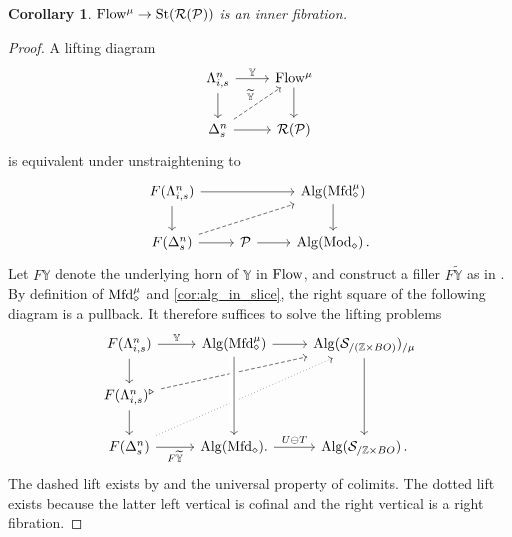 \documentclass[10pt]{amsart}
\numberwithin{equation}{section}
\newtheorem{cor}[prop]{Corollary}
\theoremstyle{definition}
\DeclareMathOperator{\Mod}{Mod}
\DeclareMathOperator{\St}{St}
\newcommand{\PreFlow}{\mathrm{Flow}\vphantom{w}}
\newcommand{\Mfd}{\mathrm{Mfd}\vphantom{d}}
\newcommand{\Alg}{\mathrm{Alg}\vphantom{z}}
\newcommand{\bZ}{\mathbb{Z}}
\newcommand{\bY}{\mathbb{Y}}
\newcommand{\Horn}{\Lambda}
\newcommand{\cP}{\mathcal{P}}
\newcommand{\cS}{\mathcal{S}}
\newcommand{\cR}{\mathcal{R}}
\renewcommand{\to}{\mathchoice{\longrightarrow}{\rightarrow}{}{}}
\begin{document}
\begin{cor}\label{cor:horn_filling}
	$\PreFlow^{\mu}\to \St(\cR(\cP))$ is an inner fibration.
\end{cor}
\begin{proof}
	A lifting diagram
	\begin{equation*}
		\begin{tikzcd}
			\Horn_{i,s}^{n} \arrow[r, "\bY"] \arrow[d]      &   \PreFlow^{\mu}  \arrow[d] \\
			\Delta^{n}_{s}  \arrow[r]  \arrow[ur,dashed, "\widetilde{\bY}"]           &  \cR(\cP)
		\end{tikzcd}
	\end{equation*}
	is equivalent under unstraightening to
	\begin{equation*}
		\begin{tikzcd}
			F(\Horn^{n}_{i,s}) \arrow[rr] \arrow[d]      &&   \Alg(\Mfd_{\diamond}^{\mu})  \arrow[d] \\
			F(\Delta^{n}_{s}) \arrow[r] \arrow[urr, dashed] &\cP  \arrow[r]               &   \Alg(\Mod_{\diamond}) \,.
		\end{tikzcd}
	\end{equation*}
	Let $F\bY$ denote the underlying horn of $\bY$ in $\PreFlow$, and construct a filler $F\widetilde{\bY}$ as in .
  By definition of $\Mfd_{\diamond}^{\mu}$ and \eqref{cor:alg_in_slice}, the right square of the following diagram is a pullback.
  It therefore suffices to solve the lifting problems
	\begin{equation*}
		\begin{tikzcd}
			F(\Horn_{i,s}^{n}) \arrow[r, "\bY"] \arrow[d]      & \Alg(\Mfd_{\diamond}^{\mu}) \arrow[r] &   \Alg(\cS_{/ (\bZ\times BO)})_{/\mu}  \arrow[dd] \\
			F(\Horn_{i,s}^{n})^{\triangleright} \arrow[d] \arrow[urr, dashed] && \\
			F(\Delta^{n}_{s})  \arrow[r, "F\widetilde{\bY}"']    \arrow[uurr, dotted]    & \Alg(\Mfd_{\diamond}) \arrow[r, "U\ominus T"].       &   \Alg(\cS_{/\bZ\times BO}) \,.
			\arrow[from=1-2, to=3-2, crossing over]
		\end{tikzcd}
	\end{equation*}
	The dashed lift exists by  and the universal property of colimits.
  The dotted lift exists because the latter left vertical is cofinal and the right vertical is a right fibration.
\end{proof}
\end{document}
